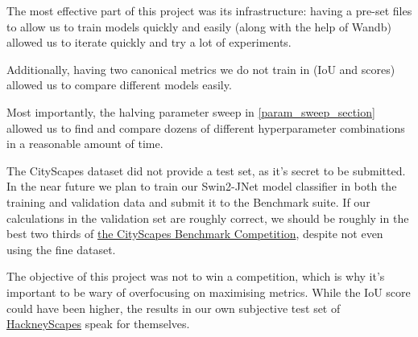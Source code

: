 The most effective part of this project was its infrastructure: having a pre-set files to allow us to train models quickly and easily (along with the help of Wandb) allowed us to iterate quickly and try a lot of experiments.

Additionally, having two canonical metrics we do not train in (IoU and \iiouc{} scores) allowed us to compare different models easily.

Most importantly, the halving parameter sweep in \cref{param_sweep_section} allowed us to find and compare dozens of different hyperparameter combinations in a reasonable amount of time.

The CityScapes dataset did not provide a test set, as it's secret to be submitted\cite{cityscapes_benchmark}.
In the near future we plan to train our Swin2-JNet model classifier in both the training and validation data and submit it to the Benchmark suite.
If our calculations in the validation set are roughly correct, we should be roughly in the best two thirds of \href{https://www.cityscapes-dataset.com/benchmarks/#pixel-level-results}{the CityScapes Benchmark Competition}, despite not even using the fine dataset.

The objective of this project was not to win a competition, which is why it's important to be wary of overfocusing on maximising metrics.
While the IoU score could have been higher, the results in our own subjective test set of \hyperref[hackneyscapes]{HackneyScapes} speak for themselves.
